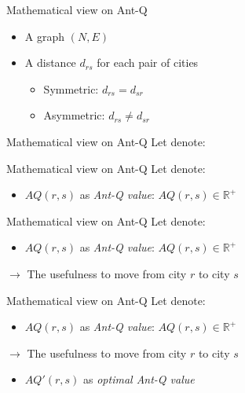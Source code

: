 \documentclass[aspectratio=169,xcolor=dvipsnames]{beamer}
\begin{document}
\begin{frame}{Mathematical view on Ant-Q}
    \begin{itemize}
        \item A graph $(N, E)$
        \item A distance $d_{rs}$ for each pair of cities
        \begin{itemize}
            \item Symmetric: $d_{rs} = d_{sr}$
            \item Asymmetric: $d_{rs} \neq d_{sr}$
        \end{itemize}
    \end{itemize}
    
\end{frame}

\begin{frame}{Mathematical view on Ant-Q}
    Let denote:
\end{frame}

\begin{frame}{Mathematical view on Ant-Q}
    Let denote:
    \begin{itemize}
        \item $AQ(r,s)$ as \textit{Ant-Q value}: $AQ(r, s) \in \mathbb{R}^+$
    \end{itemize}
\end{frame}

\begin{frame}{Mathematical view on Ant-Q}
    Let denote:
    \begin{itemize}
        \item $AQ(r,s)$ as \textit{Ant-Q value}: $AQ(r, s) \in \mathbb{R}^+$
    \end{itemize}
    $\rightarrow$ The usefulness to move from city $r$ to city $s$
\end{frame}

\begin{frame}{Mathematical view on Ant-Q}
    Let denote:
    \begin{itemize}
        \item $AQ(r,s)$ as \textit{Ant-Q value}: $AQ(r, s) \in \mathbb{R}^+$
    \end{itemize}
    $\rightarrow$ The usefulness to move from city $r$ to city $s$
    \begin{itemize}
        \item $AQ'(r, s)$ as \textit{optimal Ant-Q value}
    \end{itemize}
\end{frame}
\end{document}
